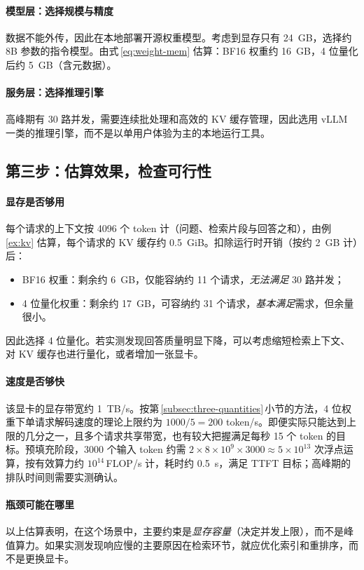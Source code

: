 \paragraph{模型层：选择规模与精度} 数据不能外传，因此在本地部署开源权重模型。考虑到显存只有 \SI{24}{GB}，选择约 8B 参数的指令模型。由式\,\eqref{eq:weight-mem} 估算：BF16 权重约 \SI{16}{GB}，4 位量化后约 \SI{5}{GB}（含元数据）。

\paragraph{服务层：选择推理引擎} 高峰期有 30 路并发，需要连续批处理和高效的 KV 缓存管理，因此选用 vLLM 一类的推理引擎，而不是以单用户体验为主的本地运行工具。

\subsection{第三步：估算效果，检查可行性}

\paragraph{显存是否够用} 每个请求的上下文按 4096 个 token 计（问题、检索片段与回答之和），由例\,\ref{ex:kv} 估算，每个请求的 KV 缓存约 \SI{0.5}{GiB}。扣除运行时开销（按约 \SI{2}{GB} 计）后：
\begin{itemize}
  \item BF16 权重：剩余约 \SI{6}{GB}，仅能容纳约 11 个请求，\emph{无法满足} 30 路并发；
  \item 4 位量化权重：剩余约 \SI{17}{GB}，可容纳约 31 个请求，\emph{基本满足}需求，但余量很小。
\end{itemize}
因此选择 4 位量化。若实测发现回答质量明显下降，可以考虑缩短检索上下文、对 KV 缓存也进行量化，或者增加一张显卡。

\paragraph{速度是否够快} 该显卡的显存带宽约 \SI{1}{TB/s}。按第\,\ref{subsec:three-quantities}\,小节的方法，4 位权重下单请求解码速度的理论上限约为 $1000/5=200$ token/s。即便实际只能达到上限的几分之一，且多个请求共享带宽，也有较大把握满足每秒 15 个 token 的目标。预填充阶段，3000 个输入 token 约需 $2\times8\times10^{9}\times3000\approx5\times10^{13}$ 次浮点运算，按有效算力约 $10^{14}$\,FLOP/s 计，耗时约 \SI{0.5}{s}，满足 TTFT 目标；高峰期的排队时间则需要实测确认。

\paragraph{瓶颈可能在哪里} 以上估算表明，在这个场景中，主要约束是\emph{显存容量}（决定并发上限），而不是峰值算力。如果实测发现响应慢的主要原因在检索环节，就应优化索引和重排序，而不是更换显卡。


